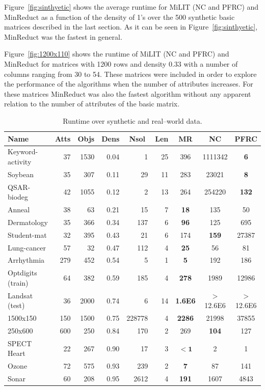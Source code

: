 \documentclass[citenumber]{llncs}
\begin{document}
	Figure~\ref{fig:sinthyetic} shows the average runtime for MiLIT (NC and PFRC) and MinReduct as a function of the density of 1’s over the 500 synthetic basic matrices described in the last section.  As it can be seen in Figure~\ref{fig:sinthyetic}, MinReduct was the fastest in general. 
	
	Figure~\ref{fig:1200x110} shows the runtime of MiLIT (NC and PFRC) and MinReduct for matrices with 1200 rows and density 0.33 with a number of columns ranging from 30 to 54. These matrices were included in order to explore the performance of the algorithms when the number of attributes increases. For these matrices MinReduct was also the fastest algorithm without any apparent relation to the number of attributes of the basic matrix.
	
	\begin{table}[htb]
		\caption{Runtime over synthetic and real--world data.}
		\centering
		\begin{tabular}{lrrrrrccc}\label{tab:comparison}
			Name  & Atts& Objs & Dens & \multicolumn{1}{c}{Nsol} & Len & MR & NC & PFRC\\
			\hline			
			Keyword-activity & 37  & 1530 & 0.04 & 1      & 25 & 396 & 1111342 & \textbf{6}\\
			Soybean          & 35  & 307  & 0.11 & 29     & 11 & 283 & 23021 & \textbf{8}\\
			QSAR-biodeg      & 42  & 1055 & 0.12 & 2      & 13 & 264 & 254220 & \textbf{132}\\
			Anneal           & 38  & 63   & 0.21 & 15     & 7  & \textbf{18} & 135 & 50\\
			Dermatology      & 35  & 366  & 0.34 & 137    & 6  & \textbf{96} & 125 & 695\\
			Student-mat      & 32  & 395  & 0.43 & 21     & 6  & 174 & \textbf{159} & 27387\\
			Lung-cancer      & 57  & 32   & 0.47 & 112    & 4  & \textbf{25} & 56 & 81\\
			Arrhythmia       & 279 & 452  & 0.54 & 5      & 1  & \textbf{5} & 192 & 186\\
			Optdigits (train)& 64  & 382  & 0.59 & 185    & 4  & \textbf{278} & 1989 & 12986\\
			Landsat (test)   & 36  & 2000 & 0.74 & 6      & 14 & \textbf{1.6E6} & $>$12.6E6 & $>$12.6E6\\
			1500x150 		 & 150 & 1500 & 0.75 & 228778 & 4  & \textbf{2286} & 21998 & 37855 \\
			250x600 		 & 600 & 250  & 0.84 & 170    & 2  & 269 & \textbf{104} & 127 \\
			SPECT Heart      & 22  & 267  & 0.90 & 17     & 3  & $\mathbf{<1}$ & 2 & 1\\
			Ozone            & 72  & 575  & 0.93 & 239    & 2  & \textbf{7} & 87 & 141\\
			Sonar            & 60  & 208  & 0.95 & 2612   & 4  & \textbf{191} & 1607 & 4843\\
		\end{tabular}             
	\end{table}  
	
\end{document}
